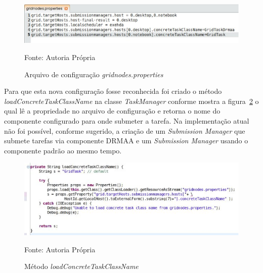 \begin{figure}[htb]
\begin{center}
\includegraphics[scale=0.5]{./img/gridnodes_properties.eps}
\caption{Arquivo de configuração \emph{gridnodes.properties}}
\label{fig:gridonodes_properties}
Fonte: Autoria Própria
\end{center}
\end{figure}

Para que esta nova configuração fosse reconhecida foi criado o método \emph{loadConcreteTaskClassName} na classe \emph{TaskManager} conforme mostra a figura~\ref{fig:Concrete} o qual lê a propriedade no arquivo de configuração e retorna o nome do componente configurado para onde submeter a tarefa. Na implementação atual não foi possível, conforme sugerido, a criação de um \emph{Submission Manager} que submete tarefas via componente DRMAA e um \emph{Submission Manager} usando o componente padrão ao mesmo tempo.

\begin{figure}[htb]
\begin{center}
\includegraphics[scale=0.7]{./img/concrete.eps}
\caption{Método \emph{loadConcreteTaskClassName}}
\label{fig:Concrete}
Fonte: Autoria Própria
\end{center}
\end{figure}